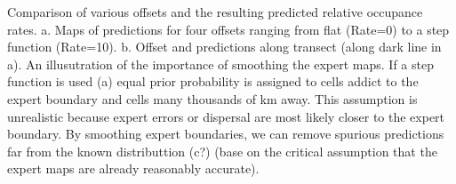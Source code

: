 Comparison of various offsets and the resulting predicted relative occupance rates.  a. Maps of predictions for four offsets ranging from flat (Rate=0) to a step function (Rate=10).  b.  Offset and predictions along transect (along dark line in a).   An illusutration of the importance of smoothing the expert maps. If a step function is used (a) equal prior probability is assigned to cells addict to the expert boundary and cells many thousands of km away. This assumption is unrealistic because expert errors or dispersal are most likely closer to the expert boundary. By smoothing expert boundaries, we can remove spurious predictions far from the known distributtion (c?) (base on the critical assumption that the expert maps are already reasonably accurate). 